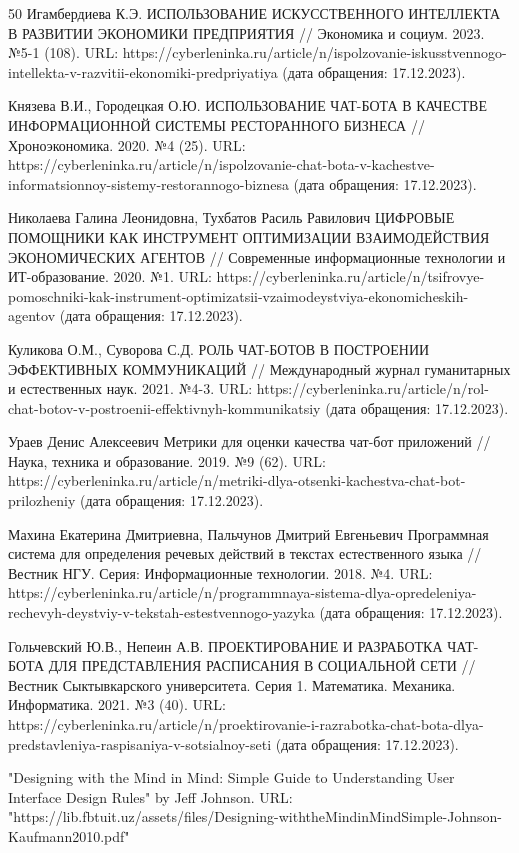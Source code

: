 \documentclass{article}
\begin{document}
\begin{thebibliography} {50}
Игамбердиева К.Э. ИСПОЛЬЗОВАНИЕ ИСКУССТВЕННОГО ИНТЕЛЛЕКТА В РАЗВИТИИ ЭКОНОМИКИ ПРЕДПРИЯТИЯ // Экономика и социум. 2023. №5-1 (108). URL: https://cyberleninka.ru/article/n/ispolzovanie-iskusstvennogo-intellekta-v-razvitii-ekonomiki-predpriyatiya (дата обращения: 17.12.2023).

Князева В.И., Городецкая О.Ю. ИСПОЛЬЗОВАНИЕ ЧАТ-БОТА В КАЧЕСТВЕ ИНФОРМАЦИОННОЙ СИСТЕМЫ РЕСТОРАННОГО БИЗНЕСА // Хроноэкономика. 2020. №4 (25). URL: https://cyberleninka.ru/article/n/ispolzovanie-chat-bota-v-kachestve-informatsionnoy-sistemy-restorannogo-biznesa (дата обращения: 17.12.2023).

Николаева Галина Леонидовна, Тухбатов Расиль Равилович ЦИФРОВЫЕ ПОМОЩНИКИ КАК ИНСТРУМЕНТ ОПТИМИЗАЦИИ ВЗАИМОДЕЙСТВИЯ ЭКОНОМИЧЕСКИХ АГЕНТОВ // Современные информационные технологии и ИТ-образование. 2020. №1. URL: https://cyberleninka.ru/article/n/tsifrovye-pomoschniki-kak-instrument-optimizatsii-vzaimodeystviya-ekonomicheskih-agentov (дата обращения: 17.12.2023).

Куликова О.М., Суворова С.Д. РОЛЬ ЧАТ-БОТОВ В ПОСТРОЕНИИ ЭФФЕКТИВНЫХ КОММУНИКАЦИЙ // Международный журнал гуманитарных и естественных наук. 2021. №4-3. URL: https://cyberleninka.ru/article/n/rol-chat-botov-v-postroenii-effektivnyh-kommunikatsiy (дата обращения: 17.12.2023).

Ураев Денис Алексеевич Метрики для оценки качества чат-бот приложений // Наука, техника и образование. 2019. №9 (62). URL: https://cyberleninka.ru/article/n/metriki-dlya-otsenki-kachestva-chat-bot-prilozheniy (дата обращения: 17.12.2023).

Махина Екатерина Дмитриевна, Пальчунов Дмитрий Евгеньевич Программная система для определения речевых действий в текстах естественного языка // Вестник НГУ. Серия: Информационные технологии. 2018. №4. URL: https://cyberleninka.ru/article/n/programmnaya-sistema-dlya-opredeleniya-rechevyh-deystviy-v-tekstah-estestvennogo-yazyka (дата обращения: 17.12.2023).

Гольчевский Ю.В., Непеин А.В. ПРОЕКТИРОВАНИЕ И РАЗРАБОТКА ЧАТ-БОТА ДЛЯ ПРЕДСТАВЛЕНИЯ РАСПИСАНИЯ В СОЦИАЛЬНОЙ СЕТИ // Вестник Сыктывкарского университета. Серия 1. Математика. Механика. Информатика. 2021. №3 (40). URL: https://cyberleninka.ru/article/n/proektirovanie-i-razrabotka-chat-bota-dlya-predstavleniya-raspisaniya-v-sotsialnoy-seti (дата обращения: 17.12.2023).

"Designing with the Mind in Mind: Simple Guide to Understanding User Interface Design Rules" by Jeff Johnson. URL: "https://lib.fbtuit.uz/assets/files/Designing-withtheMindinMindSimple-Johnson-Kaufmann2010.pdf"


\end{thebibliography}
\end{document}

